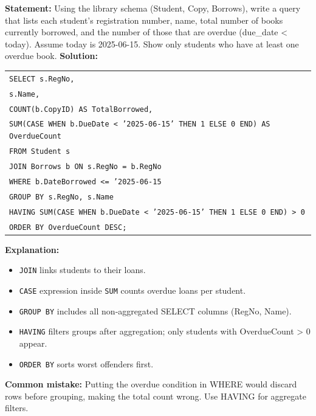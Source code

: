 \documentclass[11pt]{article}
\begin{document}
\begin{exoresolu}
\textbf{Statement:} Using the library schema (Student, Copy, Borrows), write a query that lists each student’s registration number, name, total number of books currently borrowed, and the number of those that are overdue (due\_date < today). Assume today is 2025-06-15. Show only students who have at least one overdue book.
\tcblower
\textbf{Solution:}
\begin{center}
\begin{tabular}{|l|}
\hline
\texttt{SELECT s.RegNo,} \\
\texttt{\quad s.Name,} \\
\texttt{\quad COUNT(b.CopyID) AS TotalBorrowed,} \\
\texttt{\quad SUM(CASE WHEN b.DueDate < '2025-06-15' THEN 1 ELSE 0 END) AS OverdueCount} \\
\texttt{FROM Student s} \\
\texttt{JOIN Borrows b ON s.RegNo = b.RegNo} \\
\texttt{WHERE b.DateBorrowed <= '2025-06-15} \\
\texttt{GROUP BY s.RegNo, s.Name} \\
\texttt{HAVING SUM(CASE WHEN b.DueDate < '2025-06-15' THEN 1 ELSE 0 END) > 0} \\
\texttt{ORDER BY OverdueCount DESC;} \\
\hline
\end{tabular}
\end{center}
\textbf{Explanation:}
\begin{itemize}
\item \texttt{JOIN} links students to their loans.
\item \texttt{CASE} expression inside \texttt{SUM} counts overdue loans per student.
\item \texttt{GROUP BY} includes all non‑aggregated SELECT columns (RegNo, Name).
\item \texttt{HAVING} filters groups after aggregation; only students with OverdueCount > 0 appear.
\item \texttt{ORDER BY} sorts worst offenders first.
\end{itemize}
\textbf{Common mistake:} Putting the overdue condition in WHERE would discard rows before grouping, making the total count wrong. Use HAVING for aggregate filters.
\end{exoresolu}
\end{document}
